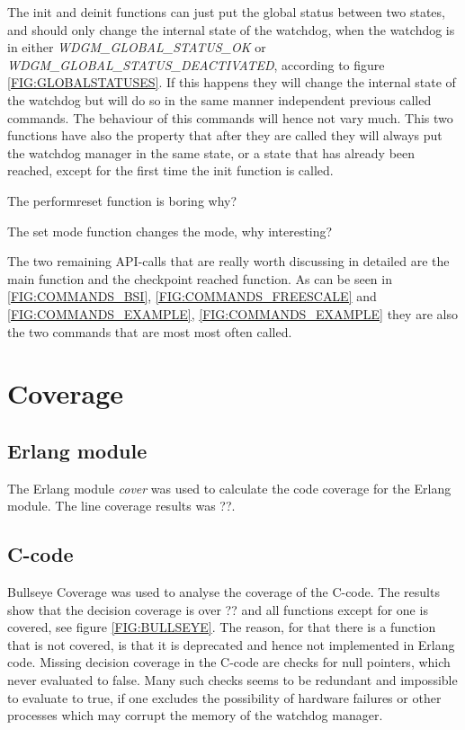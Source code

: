 The init and deinit functions can just put the global
status between two states, and should only change the internal state of the
watchdog, when the watchdog is in either \emph{WDGM\_GLOBAL\_STATUS\_OK}
or \emph{WDGM\_GLOBAL\_STATUS\_DEACTIVATED}, according to
figure \ref{FIG:GLOBALSTATUSES}. If this happens they will change the internal
state of the watchdog but will do so in the same manner independent previous
called commands. The behaviour of this commands will hence not vary much.
This two functions have also the property that after they are called they will
always put the watchdog manager in the same state, or a state that has already
been reached, except for the first time the init function is called.

The performreset function is boring why?

The set mode function changes the mode, why interesting?

The two remaining API-calls that are really worth discussing in detailed are the
main function and the checkpoint reached function. As can be seen in
\ref{FIG:COMMANDS_BSI}, \ref{FIG:COMMANDS_FREESCALE} and \ref{FIG:COMMANDS_EXAMPLE},
\ref{FIG:COMMANDS_EXAMPLE} they are also the two commands that are most most
often called.

\section{Coverage}
\subsection{Erlang module}
The Erlang module \emph{cover} was used to calculate the code coverage for the
Erlang module. The line coverage results was ??.    
\subsection{C-code}
Bullseye Coverage was used to analyse the coverage of the C-code. The results
show that the decision coverage is over ?? and all functions except for one is
covered, see figure \ref{FIG:BULLSEYE}. The reason, for that there is a function
that is not covered, is that it is deprecated and hence not implemented in Erlang
code. Missing decision coverage in the C-code are checks for null pointers,
which never evaluated to false. Many such checks seems to be redundant and
impossible to evaluate to true, if one
excludes the possibility of hardware failures or other processes which may
corrupt the memory of the watchdog manager.      

